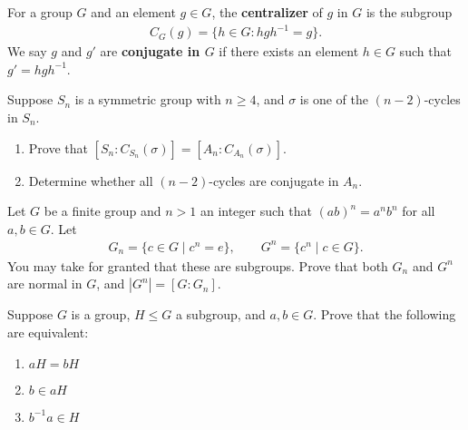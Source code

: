 \documentclass[11pt,twoside,openany]{memoir}
\begin{document}
        \begin{exercise}
        For a group $G$ and an element $g\in G$, the \textbf{centralizer} of $g$ in $G$ is the subgroup
        \begin{equation*}
        \begin{split}
        C_G(g)=\{h\in G:hgh^{-1}=g\}.
        \end{split}
        \end{equation*}
        We say $g$ and $g'$ are \textbf{conjugate in $G$} if there exists an element $h\in G$ such that $g'=hgh^{-1}$.
        
        Suppose $S_n$ is a symmetric group with $n\ge 4$, and $\sigma$ is one of the $(n-2)$-cycles in $S_n$. 
        \begin{enumerate}[label=(\alph*)]
            \item Prove that $[S_n:C_{S_n}(\sigma)]=[A_n:C_{A_n}(\sigma)]$.
            \item Determine whether all $(n-2)$-cycles are conjugate in $A_n$.
        \end{enumerate}
        \end{exercise}
        
        \begin{exercise}
        Let $G$ be a finite group and $n>1$ an integer such that $(ab)^n=a^n b^n$ for all $a,b\in G$. Let
        \begin{equation*}
        \begin{split}
        G_n=\{c\in G\mid c^n=e\},\qquad G^n=\{c^n\mid c\in G\}.
        \end{split}
        \end{equation*}
        You may take for granted that these are subgroups. Prove that both $G_n$ and $G^n$ are normal in $G$, and $|G^n|=[G:G_n]$.
        \end{exercise}
        
        \begin{exercise}
        Suppose $G$ is a group, $H\le G$ a subgroup, and $a,b\in G$. Prove that the following are equivalent:
        \begin{enumerate}[label=(\alph*)]
            \item $aH=bH$
            \item $b\in aH$
            \item $b^{-1}a\in H$
        \end{enumerate}
        \end{exercise}
        
\end{document}
